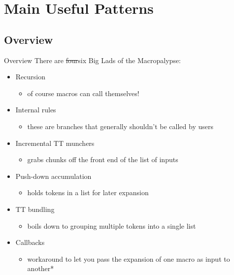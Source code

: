 \documentclass{beamer}
\begin{document}
	\section{Main Useful Patterns}
	\subsection{Overview}
	\begin{frame}{Overview}
		There are \sout{four}six Big Lads of the Macropalypse:
		\begin{itemize}
			\item Recursion
			\begin{itemize}
				\item of course macros can call themselves!
			\end{itemize}

			\pause

			\item Internal rules
			\begin{itemize}
				\item these are branches that generally shouldn't be called by users\
			\end{itemize}

			\pause

			\item Incremental TT munchers
			\begin{itemize}
				\item grabs chunks off the front end of the list of inputs
			\end{itemize}

			\pause

			\item Push-down accumulation
			\begin{itemize}
				\item holds tokens in a list for later expansion
			\end{itemize}

			\pause

			\item TT bundling
			\begin{itemize}
				\item boils down to grouping multiple tokens into a single list
			\end{itemize}

			\pause

			\item Callbacks
			\begin{itemize}
				\item workaround to let you pass the expansion of one macro as input to another*
			\end{itemize}
		\end{itemize}
	\end{frame}
\end{document}
